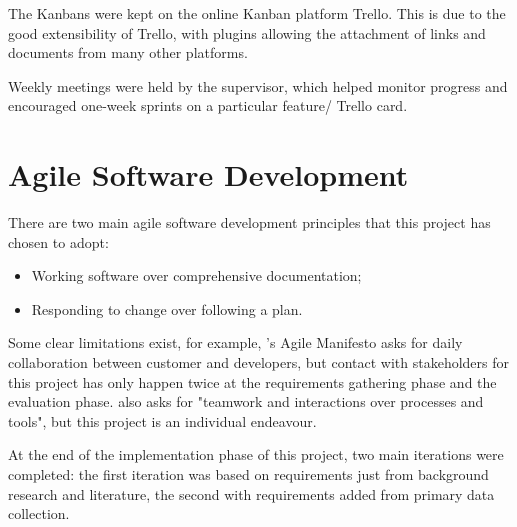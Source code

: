 The Kanbans were kept on the online Kanban platform Trello. This is due to 
the good extensibility of Trello, with plugins allowing the attachment of links and documents 
from many other platforms.

Weekly meetings were held by the supervisor, which helped monitor progress and encouraged 
one-week sprints on a particular feature/ Trello card.

\section{Agile Software Development}

There are two main agile software development principles that this project has chosen to adopt:

\begin{itemize}
    \setlength\itemsep{0em}        
    \item Working software over comprehensive documentation;
    \item Responding to change over following a plan.   
\end{itemize}

Some clear limitations exist, for example, \citet{beck2001agile}'s Agile Manifesto asks for 
daily collaboration between customer and developers, but contact with stakeholders 
for this project has only happen twice at the requirements gathering 
phase and the evaluation phase. \citet{beck2001agile} also asks for "teamwork and 
interactions over processes and tools", but this project is an individual endeavour.

At the end of the implementation phase of this project, two main iterations were completed: 
the first iteration was based on requirements just from background research and literature, 
the second with requirements added from primary data collection.
